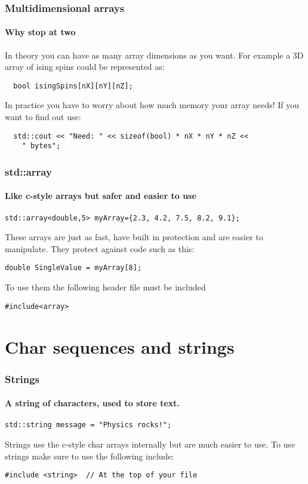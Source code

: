 \documentclass{beamer}
\begin{document}
\begin{frame}[fragile]
  \frametitle{Multidimensional arrays}
  \framesubtitle{Why stop at two}
  In theory you can have as many array dimensions as you want.  For example a 3D array of ising spins could be represented as:
  \begin{lstlisting}
  bool isingSpins[nX][nY][nZ];
  \end{lstlisting}
  In practice you have to worry about how much memory your array needs!\pause{}  If you want to find out use:
  \begin{lstlisting}
  std::cout << "Need: " << sizeof(bool) * nX * nY * nZ <<
    " bytes";
  \end{lstlisting}

\end{frame}

\begin{frame}[fragile]
	\frametitle{std::array}
	\framesubtitle{Like c-style arrays but safer and easier to use}
	\begin{lstlisting}
std::array<double,5> myArray={2.3, 4.2, 7.5, 8.2, 9.1};
	\end{lstlisting}
	These arrays are just as fast, have built in protection and are easier to manipulate. They protect against code such as this:
	\begin{lstlisting}
double SingleValue = myArray[8];
	\end{lstlisting}
	To use them the following header file must be included
	\begin{lstlisting}
#include<array>
	\end{lstlisting}
\end{frame}

\section{Char sequences and strings}


\begin{frame}[fragile]
  \frametitle{Strings}
  \framesubtitle{A string of characters, used to store text.}
  
  \begin{lstlisting}
std::string message = "Physics rocks!";
  \end{lstlisting}
  Strings use the c-style char arrays internally but are much easier to use.
  To use strings make sure to use the following include:
  \begin{lstlisting}
#include <string>  // At the top of your file
  \end{lstlisting}
\end{frame}
\end{document}
